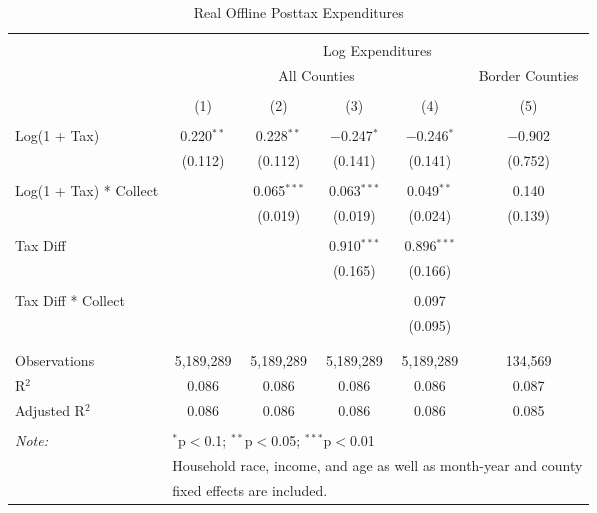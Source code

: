 
\begin{table}[!htbp] \centering 
  \caption{Real Offline Posttax Expenditures} 
  \label{} 
\begin{tabular}{@{\extracolsep{5pt}}lccccc} 
\\[-1.8ex]\hline 
\hline \\[-1.8ex] 
 & \multicolumn{5}{c}{Log Expenditures} \\ 
\cline{2-6} 
 & \multicolumn{4}{c}{All Counties} & Border Counties \\ 
\\[-1.8ex] & (1) & (2) & (3) & (4) & (5)\\ 
\hline \\[-1.8ex] 
 Log(1 + Tax) & 0.220$^{**}$ & 0.228$^{**}$ & $-$0.247$^{*}$ & $-$0.246$^{*}$ & $-$0.902 \\ 
  & (0.112) & (0.112) & (0.141) & (0.141) & (0.752) \\ 
  & & & & & \\ 
 Log(1 + Tax) * Collect &  & 0.065$^{***}$ & 0.063$^{***}$ & 0.049$^{**}$ & 0.140 \\ 
  &  & (0.019) & (0.019) & (0.024) & (0.139) \\ 
  & & & & & \\ 
 Tax Diff &  &  & 0.910$^{***}$ & 0.896$^{***}$ &  \\ 
  &  &  & (0.165) & (0.166) &  \\ 
  & & & & & \\ 
 Tax Diff * Collect &  &  &  & 0.097 &  \\ 
  &  &  &  & (0.095) &  \\ 
  & & & & & \\ 
\hline \\[-1.8ex] 
Observations & 5,189,289 & 5,189,289 & 5,189,289 & 5,189,289 & 134,569 \\ 
R$^{2}$ & 0.086 & 0.086 & 0.086 & 0.086 & 0.087 \\ 
Adjusted R$^{2}$ & 0.086 & 0.086 & 0.086 & 0.086 & 0.085 \\ 
\hline 
\hline \\[-1.8ex] 
\textit{Note:}  & \multicolumn{5}{l}{$^{*}$p$<$0.1; $^{**}$p$<$0.05; $^{***}$p$<$0.01} \\ 
 & \multicolumn{5}{l}{Household race, income, and age as well as month-year and county} \\ 
 & \multicolumn{5}{l}{fixed effects are included.} \\ 
\end{tabular} 
\end{table} 
